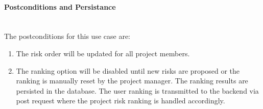 \paragraph*{Postconditions and Persistance}\mbox{}\\
The postconditions for this use case are:
\begin{enumerate}
	\vspace{-3mm}
	\setlength\itemsep{-1em}
	\item The risk order will be updated for all project members.
	\item The ranking option will be disabled until new risks are proposed or the ranking is manually reset by the project manager.
	\noindent	
	The ranking results are persisted in the database. The user ranking is transmitted to the backend via post request where the project risk ranking is handled accordingly.
\end{enumerate}